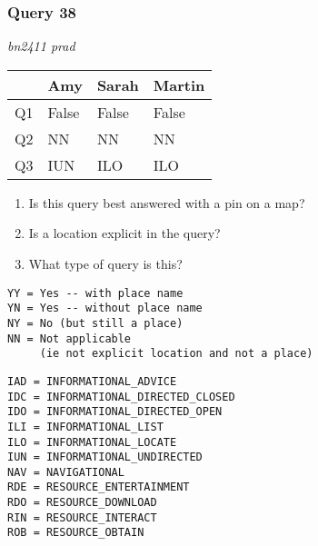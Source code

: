 \begin{frame}[fragile]
\frametitle{Query 38}
\vspace{1em}

\emph{bn2411 prad}

\vfill

\begin{table}
  \centering
  \begin{tabular}{ l l l l }
    & \textbf{Amy} & \textbf{Sarah} & \textbf{Martin}\\
    \toprule
    Q1 & False & False & False\\
Q2 & NN & NN & NN\\
Q3 & IUN & ILO & ILO\\
    \bottomrule
  \end{tabular}
\end{table}

\vfill

\tiny{

\begin{enumerate}
\item Is this query best answered with a pin on a map?
\item Is a location explicit in the query?
\item What type of query is this?
\end{enumerate}

\vfill

\begin{multicols}{2}
\begin{verbatim}
YY = Yes -- with place name
YN = Yes -- without place name
NY = No (but still a place)
NN = Not applicable 
     (ie not explicit location and not a place)
\end{verbatim}

\columnbreak
\begin{verbatim}
IAD = INFORMATIONAL_ADVICE
IDC = INFORMATIONAL_DIRECTED_CLOSED
IDO = INFORMATIONAL_DIRECTED_OPEN
ILI = INFORMATIONAL_LIST
ILO = INFORMATIONAL_LOCATE
IUN = INFORMATIONAL_UNDIRECTED
NAV = NAVIGATIONAL
RDE = RESOURCE_ENTERTAINMENT
RDO = RESOURCE_DOWNLOAD
RIN = RESOURCE_INTERACT
ROB = RESOURCE_OBTAIN
\end{verbatim}
\end{multicols}
}

\end{frame}


